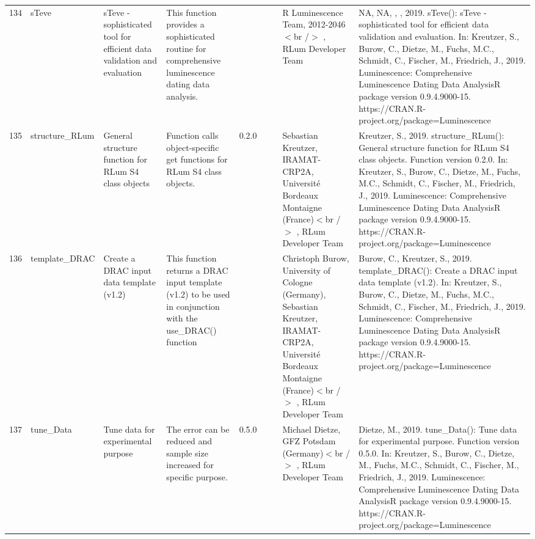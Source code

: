 \begin{table}[ht]
\begin{tabular}{rllllllll}
 \\ 
  134 & sTeve & sTeve - sophisticated tool for efficient data validation and evaluation & This function provides a sophisticated routine for comprehensive luminescence dating data analysis. &  &  &  & R Luminescence Team, 2012-2046$<$br /$>$ , RLum Developer Team & NA, NA, , , 2019. sTeve(): sTeve - sophisticated tool for efficient data validation and evaluation. In: Kreutzer, S., Burow, C., Dietze, M., Fuchs, M.C., Schmidt, C., Fischer, M., Friedrich, J., 2019. Luminescence: Comprehensive Luminescence Dating Data AnalysisR package version 0.9.4.9000-15. https://CRAN.R-project.org/package=Luminescence
 \\ 
  135 & structure\_RLum & General structure function for RLum S4 class objects & Function calls object-specific get functions for RLum S4 class objects. & 0.2.0
 &  &  & Sebastian Kreutzer, IRAMAT-CRP2A, Université Bordeaux Montaigne (France)$<$br /$>$ , RLum Developer Team & Kreutzer, S., 2019. structure\_RLum(): General structure function for RLum S4 class objects. Function version 0.2.0. In: Kreutzer, S., Burow, C., Dietze, M., Fuchs, M.C., Schmidt, C., Fischer, M., Friedrich, J., 2019. Luminescence: Comprehensive Luminescence Dating Data AnalysisR package version 0.9.4.9000-15. https://CRAN.R-project.org/package=Luminescence
 \\ 
  136 & template\_DRAC & Create a DRAC input data template (v1.2) & This function returns a DRAC input template (v1.2) to be used in conjunction with the use\_DRAC() function &  &  &  & Christoph Burow, University of Cologne (Germany), Sebastian Kreutzer, IRAMAT-CRP2A, Université Bordeaux Montaigne (France)$<$br /$>$ , RLum Developer Team & Burow, C., Kreutzer, S., 2019. template\_DRAC(): Create a DRAC input data template (v1.2). In: Kreutzer, S., Burow, C., Dietze, M., Fuchs, M.C., Schmidt, C., Fischer, M., Friedrich, J., 2019. Luminescence: Comprehensive Luminescence Dating Data AnalysisR package version 0.9.4.9000-15. https://CRAN.R-project.org/package=Luminescence
 \\ 
  137 & tune\_Data & Tune data for experimental purpose & The error can be reduced and sample size increased for specific purpose. & 0.5.0
 &  &  & Michael Dietze, GFZ Potsdam (Germany)$<$br /$>$ , RLum Developer Team & Dietze, M., 2019. tune\_Data(): Tune data for experimental purpose. Function version 0.5.0. In: Kreutzer, S., Burow, C., Dietze, M., Fuchs, M.C., Schmidt, C., Fischer, M., Friedrich, J., 2019. Luminescence: Comprehensive Luminescence Dating Data AnalysisR package version 0.9.4.9000-15. https://CRAN.R-project.org/package=Luminescence

\end{tabular}
\end{table}
